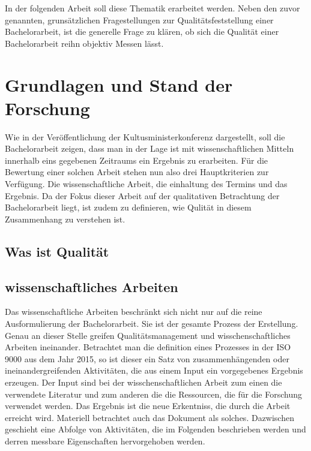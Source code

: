 In der folgenden Arbeit soll diese Thematik erarbeitet werden. Neben den zuvor genannten, grunsätzlichen Fragestellungen zur Qualitätsfeststellung einer Bachelorarbeit, ist die generelle Frage zu klären, ob sich die Qualität einer Bachelorarbeit reihn objektiv Messen lässt. 


\section{Grundlagen und Stand der Forschung}
Wie in der Veröffentlichung der Kultusministerkonferenz dargestellt, soll die Bachelorarbeit zeigen, dass man in der Lage ist mit wissenschaftlichen Mitteln innerhalb eins gegebenen Zeitraums ein Ergebnis zu erarbeiten. Für die Bewertung einer solchen Arbeit stehen nun also drei Hauptkriterien zur Verfügung. Die wissenschaftliche Arbeit, die einhaltung des Termins und das Ergebnis. Da der Fokus dieser Arbeit auf der qualitativen Betrachtung der Bachelorarbeit liegt, ist zudem zu definieren, wie Qulität in diesem Zusammenhang zu verstehen ist.
\subsection{Was ist Qualität}

\subsection{wissenschaftliches Arbeiten}
Das wissenschaftliche Arbeiten beschränkt sich nicht nur auf die reine Ausformulierung der Bachelorarbeit. Sie ist der gesamte Prozess der Erstellung. Genau an dieser Stelle greifen Qualitätsmanagement und wisschenschaftliches Arbeiten ineinander. Betrachtet man die definition eines Prozesses in der ISO 9000 aus dem Jahr 2015, so ist dieser ein Satz von zusammenhängenden oder ineinandergreifenden Aktivitäten, die aus einem Input ein vorgegebenes Ergebnis erzeugen.\cite[Vgl.][]{iso9000:2015}
Der Input sind bei der wisschenschaftlichen Arbeit zum einen die verwendete Literatur und zum anderen die die Ressourcen, die für die Forschung verwendet werden. Das Ergebnis ist die neue Erkentniss, die durch die Arbeit erreicht wird. Materiell betrachtet auch das Dokument als solches. Dazwischen geschieht eine Abfolge von Aktivitäten, die im Folgenden beschrieben werden und derren messbare Eigenschaften hervorgehoben werden.


